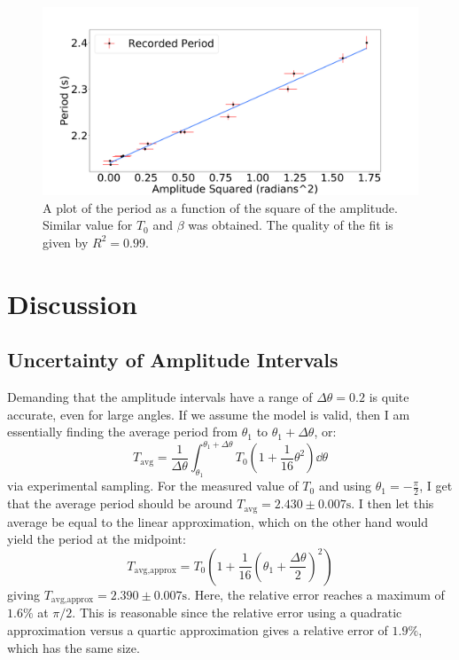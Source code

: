 \documentclass[%
 reprint,
 amsmath,amssymb
 aps,
]{revtex4-2}
\begin{document}
\begin{figure}[!h]
    \includegraphics[width=\linewidth]{Figures/period-vs-amplitude-linear.png}

    \caption{A plot of the period as a function of the square of the amplitude. Similar value for $T_0$ and $\beta$ was obtained. The quality of the fit is given by $R^2=0.99$.}
    \label{fig:period-vs-amplitude-linear}
\end{figure}
\section{Discussion}
\subsection{Uncertainty of Amplitude Intervals}
Demanding that the amplitude intervals have a range of $\Delta \theta = 0.2$ is quite accurate, even for large angles. If we assume the model is valid, then I am essentially finding the average period from $\theta_1$ to $\theta_1+\Delta \theta$, or:
\begin{equation}
    T_\text{avg} = \frac{1}{\Delta \theta}\int_{\theta_1}^{\theta_1+\Delta \theta} T_0\left(1+\frac{1}{16}\theta^2\right)\dd{\theta}
    \label{eq:}
\end{equation}
via experimental sampling. For the measured value of $T_0$ and using $\theta_1=-\frac{\pi}{2}$, I get that the average period should be around $T_\text{avg}=2.430 \pm 0.007\si{\second}$. I then let this average be equal to the linear approximation, which on the other hand would yield the period at the midpoint:
\begin{equation}
    T_\text{avg,approx} = T_0\left(1+\frac{1}{16}\left(\theta_1+\frac{\Delta \theta}{2}\right)^2\right)
    \label{eq:}
\end{equation}
giving $T_\text{avg,approx}=2.390 \pm 0.007 \si{\second}$. Here, the relative error reaches a maximum of $1.6\%$ at $\pi/2$. This is reasonable since the relative error using a quadratic approximation versus a quartic approximation gives a relative error of $1.9\%$, which has the same size.
\end{document}
